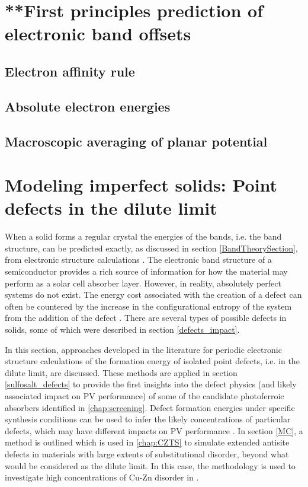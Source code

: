 \documentclass[11pt, twoside]{report}
\begin{document}
\section{**First principles prediction of electronic band offsets}
\subsection{Electron affinity rule}
\subsection{Absolute electron energies}
\subsection{Macroscopic averaging of planar potential}


\section{Modeling imperfect solids: Point defects in the dilute limit}\label{defects_methods}
When a solid forms a regular crystal the energies of the bands, i.e. the band structure, can be predicted exactly, as discussed in section \ref{BandTheorySection}, from electronic structure calculations \cite{Nelson3}.
The electronic band structure of a semiconductor provides a rich source of information for how the material may perform as a solar cell absorber layer. However, in reality, absolutely perfect systems do not exist. The energy cost associated with the creation of a defect can often be countered by the increase in the configurational entropy of the system from the addition of the defect \cite{AshcroftMermin_general}.
There are several types of possible defects in solids, some of which were described in section \ref{defects_impact}. 

In this section, approaches developed in the literature for periodic electronic structure calculations of the formation energy of isolated point defects, i.e. in the dilute limit, are discussed. 
These methods are applied in section \ref{sulfosalt_defects} to provide the first insights into the defect physics (and likely associated impact on PV performance) of some of the candidate photoferroic absorbers identified in \autoref{chap:screening}. 
Defect formation energies under specific synthesis conditions can be used to infer the likely concentrations of particular defects, which may have different impacts on PV performance \cite{Aron_defect_tolerance}. 
In section \ref{MC}, a method is outlined which is used in \autoref{chap:CZTS} to simulate extended antisite defects in materials with large extents of substitutional disorder, beyond what would be considered as the dilute limit. In this case, the methodology is used to investigate high concentrations of Cu-Zn disorder in {\CZTS}. 
\end{document}
